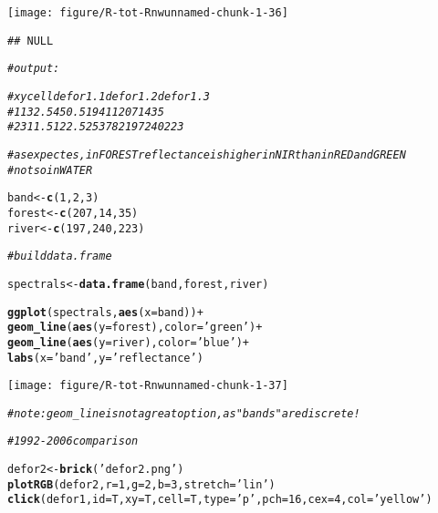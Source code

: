 \documentclass{article}\usepackage[]{graphicx}\usepackage[]{color}
\makeatletter
\newcommand{\hlnum}[1]{\textcolor[rgb]{0.686,0.059,0.569}{#1}}%
\newcommand{\hlstr}[1]{\textcolor[rgb]{0.192,0.494,0.8}{#1}}%
\newcommand{\hlcom}[1]{\textcolor[rgb]{0.678,0.584,0.686}{\textit{#1}}}%
\newcommand{\hlopt}[1]{\textcolor[rgb]{0,0,0}{#1}}%
\newcommand{\hlstd}[1]{\textcolor[rgb]{0.345,0.345,0.345}{#1}}%
\newcommand{\hlkwb}[1]{\textcolor[rgb]{0.69,0.353,0.396}{#1}}%
\newcommand{\hlkwc}[1]{\textcolor[rgb]{0.333,0.667,0.333}{#1}}%
\newcommand{\hlkwd}[1]{\textcolor[rgb]{0.737,0.353,0.396}{\textbf{#1}}}%
\newenvironment{kframe}{%
 \def\at@end@of@kframe{}%
 \ifinner\ifhmode%
  \def\at@end@of@kframe{\end{minipage}}%
  \begin{minipage}{\columnwidth}%
 \fi\fi%
 \def\FrameCommand##1{\hskip\@totalleftmargin \hskip-\fboxsep
 \colorbox{shadecolor}{##1}\hskip-\fboxsep
     \hskip-\linewidth \hskip-\@totalleftmargin \hskip\columnwidth}%
 \MakeFramed {\advance\hsize-\width
   \@totalleftmargin\z@ \linewidth\hsize
   \@setminipage}}%
 {\par\unskip\endMakeFramed%
 \at@end@of@kframe}
\newenvironment{knitrout}{}{} %
\makeatother
\begin{document}
\begin{knitrout}
{\centering \texttt{[image: figure/R-tot-Rnwunnamed-chunk-1-36]} 

}


\begin{kframe}\begin{verbatim}
## NULL
\end{verbatim}
\begin{alltt}
\hlcom{# output:}

\hlcom{#       x     y   cell defor1.1 defor1.2 defor1.3}
\hlcom{# 1 132.5 450.5  19411      207       14       35}
\hlcom{# 2 311.5 122.5 253782      197      240      223}

\hlcom{# as expectes, in FOREST reflectance is higher in NIR than in RED and GREEN}
\hlcom{# not so in WATER}

\hlstd{band} \hlkwb{<-} \hlkwd{c}\hlstd{(}\hlnum{1}\hlstd{,} \hlnum{2}\hlstd{,} \hlnum{3}\hlstd{)}
\hlstd{forest} \hlkwb{<-} \hlkwd{c}\hlstd{(}\hlnum{207}\hlstd{,} \hlnum{14}\hlstd{,} \hlnum{35}\hlstd{)}
\hlstd{river} \hlkwb{<-} \hlkwd{c}\hlstd{(}\hlnum{197}\hlstd{,} \hlnum{240}\hlstd{,} \hlnum{223}\hlstd{)}

\hlcom{# build data.frame}

\hlstd{spectrals} \hlkwb{<-} \hlkwd{data.frame}\hlstd{(band, forest, river)}

\hlkwd{ggplot}\hlstd{(spectrals,} \hlkwd{aes}\hlstd{(}\hlkwc{x} \hlstd{= band))} \hlopt{+}
  \hlkwd{geom_line}\hlstd{(}\hlkwd{aes}\hlstd{(}\hlkwc{y} \hlstd{= forest),} \hlkwc{color} \hlstd{=} \hlstr{'green'}\hlstd{)} \hlopt{+}
  \hlkwd{geom_line}\hlstd{(}\hlkwd{aes}\hlstd{(}\hlkwc{y} \hlstd{= river),} \hlkwc{color} \hlstd{=} \hlstr{'blue'}\hlstd{)} \hlopt{+}
  \hlkwd{labs}\hlstd{(}\hlkwc{x} \hlstd{=} \hlstr{'band'}\hlstd{,} \hlkwc{y} \hlstd{=} \hlstr{'reflectance'}\hlstd{)}
\end{alltt}
\end{kframe}

{\centering \texttt{[image: figure/R-tot-Rnwunnamed-chunk-1-37]} 

}


\begin{kframe}\begin{alltt}
\hlcom{# note: geom_line is not a great option, as "bands" are discrete!}

\hlcom{# 1992 - 2006 comparison}

\hlstd{defor2} \hlkwb{<-} \hlkwd{brick}\hlstd{(}\hlstr{'defor2.png'}\hlstd{)}
\hlkwd{plotRGB}\hlstd{(defor2,} \hlkwc{r} \hlstd{=} \hlnum{1}\hlstd{,} \hlkwc{g} \hlstd{=} \hlnum{2}\hlstd{,} \hlkwc{b} \hlstd{=} \hlnum{3}\hlstd{,} \hlkwc{stretch} \hlstd{=} \hlstr{'lin'}\hlstd{)}
\hlkwd{click}\hlstd{(defor1,} \hlkwc{id} \hlstd{= T,} \hlkwc{xy} \hlstd{= T,} \hlkwc{cell} \hlstd{= T,} \hlkwc{type} \hlstd{=} \hlstr{'p'}\hlstd{,} \hlkwc{pch} \hlstd{=} \hlnum{16}\hlstd{,} \hlkwc{cex} \hlstd{=} \hlnum{4}\hlstd{,} \hlkwc{col} \hlstd{=} \hlstr{'yellow'}\hlstd{)}
\end{alltt}
\end{kframe}


\end{knitrout}
\end{document}
